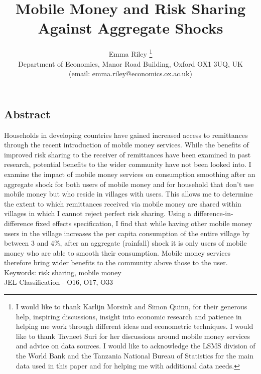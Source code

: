 \documentclass[a4paper]{article}
\begin{document}
\begin{titlepage}
\title{Mobile Money and Risk Sharing Against Aggregate Shocks}
\author{Emma Riley \footnote{I would like to thank  Karlijn Morsink and Simon Quinn, for their generous help, inspiring discussions, insight into economic research and patience in helping me work through different ideas and econometric techniques. I would like to thank Tavneet Suri for her discussions around mobile money services and advice on data sources. I would like to acknowledge the LSMS division of the World Bank and the Tanzania National Bureau of Statistics for the main data used in this paper and for helping me with additional data needs.} \\ Department of Economics, Manor Road Building, Oxford OX1 3UQ, UK \\ (email: emma.riley@economics.ox.ac.uk)}
\thispagestyle{empty}
\maketitle 
\begin{center}
\section*{Abstract}
\end{center}
Households in developing countries have gained increased access to remittances through the recent introduction of mobile money services. While the benefits of improved risk sharing to the receiver of remittances have been examined in past research, potential benefits to the wider community have not been looked into. I examine the impact of mobile money services on consumption smoothing after an aggregate shock for both users of mobile money and for household that don't use mobile money but who reside in villages with users. This allows me to determine the extent to which remittances received via mobile money are shared within villages in which I cannot reject perfect risk sharing. Using a difference-in-difference fixed effects specification, I find that while having other mobile money users in the village increases the per capita consumption of the entire village by between  3 and 4\%, after an aggregate (rainfall) shock it is only users of mobile money who are able to smooth their consumption. Mobile money services therefore bring wider benefits to the community above those to the user. \\

\noindent Keywords: risk sharing, mobile money \\
JEL Classification - O16, O17, O33
\thispagestyle{empty}



\end{titlepage}
\end{document}
